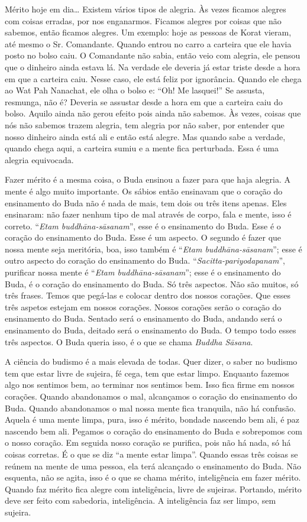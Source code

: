Mérito hoje em dia… Existem vários tipos de alegria. Às vezes
ficamos alegres com coisas erradas, por nos enganarmos. Ficamos alegres
por coisas que não sabemos, então ficamos alegres. Um exemplo: hoje as
pessoas de Korat vieram, até mesmo o Sr. Comandante. Quando entrou no
carro a carteira que ele havia posto no bolso caiu. O Comandante não
sabia, então veio com alegria, ele pensou que o dinheiro ainda estava
lá. Na verdade ele deveria já estar triste desde a hora em que a
carteira caiu. Nesse caso, ele está feliz por ignorância. Quando ele
chega ao Wat Pah Nanachat, ele olha o bolso e: “Oh! Me lasquei!” Se
assusta, resmunga, não é? Deveria se assustar desde a hora em que a
carteira caiu do bolso. Aquilo ainda não gerou efeito pois ainda não
sabemos. Às vezes, coisas que nós não sabemos trazem alegria, tem
alegria por não saber, por entender que nosso dinheiro ainda está ali e
então está alegre. Mas quando sabe a verdade, quando chega aqui, a
carteira sumiu e a mente fica perturbada. Essa é uma alegria
equivocada. 

Fazer mérito é a mesma coisa, o Buda ensinou a fazer para que haja
alegria. A mente é algo muito importante. Os sábios então ensinavam que
o coração do ensinamento do Buda não é nada de mais, tem dois ou três
itens apenas. Eles ensinaram: não fazer nenhum tipo de mal através de
corpo, fala e mente, isso é correto. “\textit{Etam
buddh\=ana-s\=asanam}”, esse é o ensinamento do Buda. Esse é o coração
do ensinamento do Buda. Esse é um aspecto. O segundo é fazer que nossa
mente seja meritória, boa, isso também é “\textit{Etam
buddh\=ana-s\=asanam}”; esse é outro aspecto do coração do ensinamento
do Buda. “\textit{Sacitta-pariyodapanam}”, purificar nossa mente é
“\textit{Etam buddh\=ana-s\=asanam}”; esse é o ensinamento do Buda, é o
coração do ensinamento do Buda. Só três aspectos. Não são muitos, só
três frases. Temos que pegá-las e colocar dentro dos nossos corações.
Que esses três aspetos estejam em nossos corações. Nossos corações
serão o coração do ensinamento do Buda. Sentado será o ensinamento do
Buda, andando será o ensinamento do Buda, deitado será o ensinamento do
Buda. O tempo todo esses três aspectos. O Buda queria isso, é o que se
chama \textit{Buddha S\=asana}. 

A ciência do budismo é a mais elevada de todas. Quer dizer, o saber
no budismo tem que estar livre de sujeira, fé cega, tem que estar
limpo. Enquanto fazemos algo nos sentimos bem, ao terminar nos sentimos
bem. Isso fica firme em nossos corações. Quando abandonamos o mal,
alcançamos o coração do ensinamento do Buda. Quando abandonamos o mal
nossa mente fica tranquila, não há confusão. Aquela é uma mente limpa,
pura, isso é mérito, bondade nascendo bem ali, é paz nascendo bem ali.
Pegamos o coração do ensinamento do Buda e sobrepomos com o nosso
coração. Em seguida nosso coração se purifica, pois não há nada, só há
coisas corretas. É o que se diz “a mente estar limpa”. Quando essas
três coisas se reúnem na mente de uma pessoa, ela terá alcançado o
ensinamento do Buda. Não esquenta, não se agita, isso é o que se chama
mérito, inteligência em fazer mérito. Quando faz mérito fica alegre com
inteligência, livre de sujeiras. Portando, mérito deve ser feito com
sabedoria, inteligência. A inteligência faz ser limpo, sem sujeira. 

